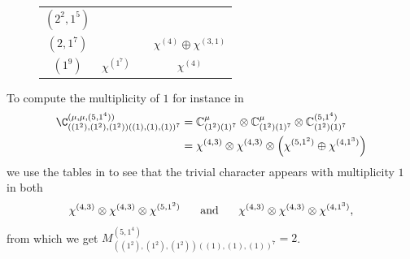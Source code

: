 \begin{figure}
\begin{tabular}{|c|c|c|c|}
		&\makecell{$\substack{\chi^{(4)}\oplus 2\chi^{(3,1)} \\ \oplus \chi^{(2^2)}\oplus \chi^{(2,1^2)}}$}\\ \hline
		$(2^2,1^5)$ & \makecell{ $\substack{\chi^{(2^2,1^3)}\\ \oplus \chi^{(2,1^5)} \oplus \chi^{(1^7)}}$} &\makecell{$\substack{ (\chi^{(3)}\boxtimes\chi^{(2,1)} ) \oplus  (\chi^{(2,1)}\boxtimes\chi^{(2,1)}) \\ \oplus  2 (\chi^{(3)}\boxtimes\chi^{(1^3)}) \oplus 2(  \chi^{(2,1)}\boxtimes\chi^{(1^3)}  ) }$}
		&\makecell{$\substack{\chi^{(4)}\\ \oplus 2\chi^{(3,1)}  \oplus \chi^{(2^2)}} $}\\ \hline
		$(2,1^7)$ & \makecell{ $\chi^{(2,1^5)}  \oplus \chi^{(1^7)}$} & 
		\makecell{$\substack{ (\chi^{(3)}\boxtimes\chi^{(2,1)} )  \\ \oplus  (\chi^{(3)}\boxtimes\chi^{(1^3)}) \oplus (  \chi^{(2,1)}\boxtimes\chi^{(1^3)}  ) }$}
		& $\chi^{(4)}\oplus \chi^{(3,1)}$ \\ \hline
		$(1^9)$ & $\chi^{(1^7)}$ &
		\makecell{$\chi^{(3)}\boxtimes \chi^{(1^3)}$}& $\chi^{(4)}$ \\ \hline
	\end{tabular}
\end{figure}



To compute the multiplicity of $1$ for instance in 
\begin{align*}
	\C_{((1^2),(1^2),(1^2))((1),(1),(1))^7}^{(\mu,\mu,(5,1^4))}&=\mathbb{C}^\mu_{(1^2)(1)^7}\otimes\mathbb{C}^\mu_{(1^2)(1)^7}\otimes\mathbb{C}^{(5,1^4)}_{(1^2)(1)^7}
	\\
	&=\chi^{(4,3)}\otimes\chi^{(4,3)}\otimes\left(\chi^{(5,1^2)}\oplus\chi^{(4,1^3)}\right)
\end{align*}
we use the tables in \cite{Gi} to see that the trivial character appears with multiplicity $1$ in both 
$$
\chi^{(4,3)}\otimes\chi^{(4,3)}\otimes\chi^{(5,1^2)}\hspace{.5cm}\text{ and }\hspace{.5cm}\chi^{(4,3)}\otimes\chi^{(4,3)}\otimes\chi^{(4,1^3)},
$$
from which we get $M^{(5,1^4)}_{((1^2),(1^2),(1^2))((1),(1),(1))^7}=2$.
